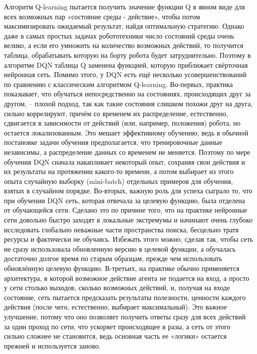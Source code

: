 Алгоритм Q-learning пытается получить значение функции Q в явном виде для всех возможных пар «состояние среды - действие», чтобы потом максимизировать ожидаемый результат, найдя оптимальную стратегию. 
Однако даже в самых простых задачах робототехники число состояний среды очень велико, а если его умножить на количество возможных действий, то получится таблица, обрабатывать которую на борту робота будет затруднительно. 
Поэтому в алгоритме DQN таблица Q заменена функцией, которую приближает свёрточная нейронная сеть. 
Помимо этого, у DQN есть ещё несколько усовершенствований по сравнению с классическим алгоритмом Q-learning. 
Во-первых, практика показывает, что обучаться непосредственно на состояниях, происходящих друг за другом, -- плохой подход, так как такие состояния слишком похожи друг на друга, сильно коррелируют, причём со временем их распределение, естественно, сдвигается в зависимости от действий (или, например, положения) робота, но остается локализованным. 
Это мешает эффективному обучению, ведь в обычной постановке задачи обучения предполагается, что тренировочные данные независимы, а распределение данных со временем не меняется. 
Поэтому по мере обучения DQN сначала накапливает некоторый опыт, сохраняя свои действия и их результаты на протяжении какого-то времени, а потом выбирает из этого опыта случайную выборку (mini-batch) отдельных примеров для обучения, взятых в случайном порядке. 
Во-вторых, важную роль для успеха сыграло то, что при обучении DQN сеть, которая отвечала за целевую функцию, была отделена от обучающейся сети. 
Сделано это по причине того, что на практике нейронные сети довольно быстро заходят в локальные экстремумы и начинают очень глубоко исследовать глобально неважные части пространства поиска, бесцельно тратя ресурсы и фактически не обучаясь. 
Избежать этого можно, сделав так, чтобы сеть не сразу использовала обновленную версию в целевой функции, а обучалась достаточно долгое время по старым образцам, прежде чем использовать обновлённую целевую функцию. 
В-третьих, на практике обычно применяется архитектура, в которой возможное действие агента не подается на вход, а просто у сети столько выходов, сколько возможных действий, и, получая на входе состояние, сеть пытается предсказать результаты полезности, ценности каждого действия (после чего, естественно, выбирает максимальный). 
Это важное улучшение, потому что оно позволяет получить ответы сразу для всех действий за один проход по сети, что ускоряет происходящее в разы, а сеть от этого сильно сложнее не становится, ведь основная часть ее «логики» остается прежней и используется заново.

